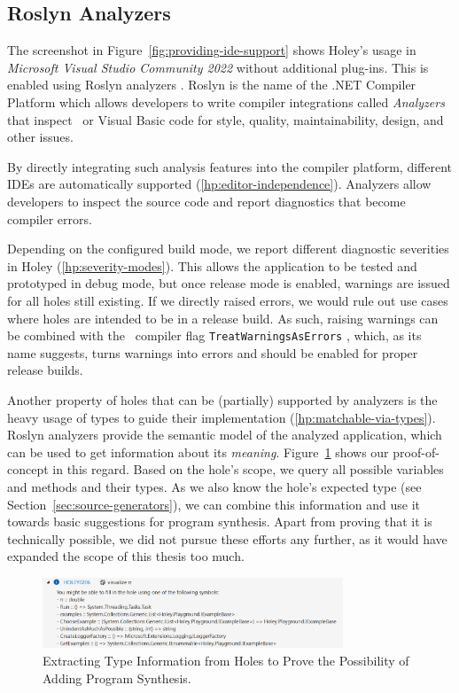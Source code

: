 \subsection{Roslyn Analyzers}
\label{sec:holey-roslyn-analyzers}
The screenshot in Figure~\ref{fig:providing-ide-support} shows Holey's usage in \emph{Microsoft Visual Studio Community 2022} without additional plug-ins.
This is enabled using Roslyn analyzers \cite{microsoft_code_2023}.
Roslyn is the name of the .NET Compiler Platform which allows developers to write compiler integrations called \emph{Analyzers} that inspect \CS\ or Visual Basic code for style, quality, maintainability, design, and other issues.

By directly integrating such analysis features into the compiler platform, different IDEs are automatically supported (\ref{hp:editor-independence}).
Analyzers allow developers to inspect the source code and report diagnostics that become compiler errors.

Depending on the configured build mode, we report different diagnostic severities in Holey (\ref{hp:severity-modes}).
This allows the application to be tested and prototyped in debug mode, but once release mode is enabled, warnings are issued for all holes still existing.
If we directly raised errors, we would rule out use cases where holes are intended to be in a release build.
As such, raising warnings can be combined with the \CS\ compiler flag \verb|TreatWarningsAsErrors| \cite{microsoft_c_2023}, which, as its name suggests, turns warnings into errors and should be enabled for proper release builds.

Another property of holes that can be (partially) supported by analyzers is the heavy usage of types to guide their implementation (\ref{hp:matchable-via-types}).
Roslyn analyzers provide the semantic model of the analyzed application, which can be used to get information about its \emph{meaning}.
Figure~\ref{fig:reporting-types} shows our proof-of-concept in this regard.
Based on the hole's scope, we query all possible variables and methods and their types.
As we also know the hole's expected type (see Section~\ref{sec:source-generators}), we can combine this information and use it towards basic suggestions for program synthesis.
Apart from proving that it is technically possible, we did not pursue these efforts any further, as it would have expanded the scope of this thesis too much.

\begin{figure}[ht]
    \centering
    \includegraphics[width=0.8\textwidth]{images/reporting-types}
    \caption{Extracting Type Information from Holes to Prove the Possibility of Adding Program Synthesis.}
    \label{fig:reporting-types}
\end{figure}

